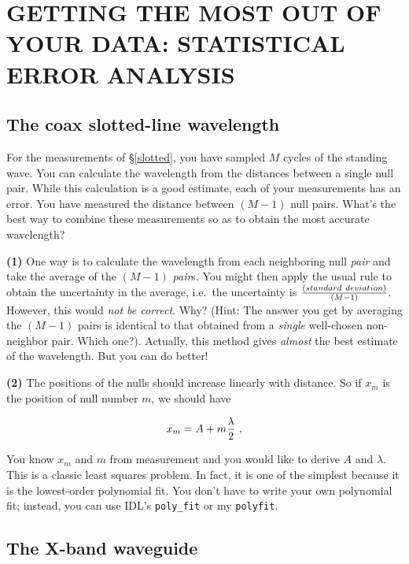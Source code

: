 \documentclass[preprint]{aastex}
\begin{document}
\section {GETTING THE MOST OUT OF YOUR DATA: STATISTICAL ERROR
ANALYSIS} \label{secondweek}

\subsection{The coax slotted-line wavelength} \label{lbandcoax} \label{slottedls}

	For the measurements of \S \ref{slotted}, you have sampled $M$
cycles of the standing wave. You can calculate the wavelength from the
distances between a single null pair. While this calculation is a good
estimate, each of your measurements has an error. You have measured the
distance between $(M-1)$ null pairs. What's the best way to combine
these measurements so as to obtain the most accurate wavelength?

	{\bf (1)} One way is to calculate the wavelength from each
neighboring null {\it pair} and take the average of the $(M-1)$ {\it
pair}s.  You might then apply the usual rule to obtain the uncertainty
in the average, i.e.\ the uncertainty is $(standard \ deviation) \over
(M-1)$.  However, this would {\it not be correct}.  Why? (Hint: The
answer you get by averaging the $(M-1)$ pairs is identical to that
obtained from a {\it single} well-chosen non-neighbor pair.  Which
one?).  Actually, this method gives {\it almost} the best estimate of
the wavelength.  But you can do better!

	{\bf (2)} The positions of the nulls should increase linearly
with distance. So if $x_{m}$ is the position of null number $m$, we
should have

\begin{equation}
x_m = A + m {\lambda \over 2} \ ,
\end{equation}

\noindent You know $x_m$ and $m$ from measurement and you would like to
derive $A$ and $\lambda$. This is a classic least squares problem. In
fact, it is one of the simplest because it is the lowest-order polynomial
fit. You don't have to write your own polynomial fit; instead, you can
use IDL's \verb$poly_fit$ or my \verb$polyfit$. 

\subsection{The X-band waveguide}
\end{document}
